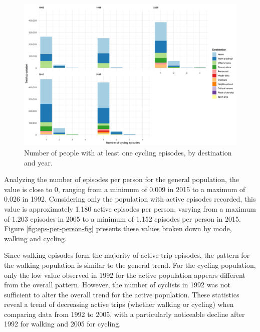 \documentclass[preprint, 3p,
authoryear]{elsarticle} %
\begin{document}
\begin{figure}

{\centering \includegraphics[width=1\linewidth]{figures/people_per_ep_cycling} 

}

\caption{Number of people with at least one cycling episodes, by destination and year.}\label{fig:cycling-population-by-year-destination-fig}
\end{figure}

Analyzing the number of episodes per person for the general population,
the value is close to 0, ranging from a minimum of 0.009 in 2015 to a
maximum of 0.026 in 1992. Considering only the population with active
episodes recorded, this value is approximately 1.180 active episodes per
person, varying from a maximum of 1.203 episodes in 2005 to a minimum of
1.152 episodes per person in 2015. Figure \ref{fig:eps-per-person-fig}
presents these values broken down by mode, walking and cycling.

Since walking episodes form the majority of active trip episodes, the
pattern for the walking population is similar to the general trend. For
the cycling population, only the low value observed in 1992 for the
active population appears different from the overall pattern. However,
the number of cyclists in 1992 was not sufficient to alter the overall
trend for the active population. These statistics reveal a trend of
decreasing active trips (whether walking or cycling) when comparing data
from 1992 to 2005, with a particularly noticeable decline after 1992 for
walking and 2005 for cycling.
\end{document}
